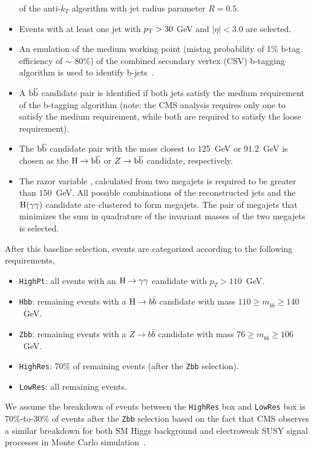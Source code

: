 \begin{itemize}
  of the anti-$k_T$\cite{antikt} algorithm with jet radius parameter $R=0.5$.
\item Events with at least one jet with $p_{\mathrm{T}}>30$ GeV and $|\eta|<3.0$
  are selected.
\item An emulation of the medium working point (mistag probability of
  1\% b-tag efficiency of $\sim$ 80\%) of the combined secondary vertex (CSV) b-tagging
  algorithm is used to identify b-jets~\cite{btag8TeV}.
\item A $\mathrm{b}\overline{\mathrm{b}}$ candidate pair is identified if both jets satisfy the medium requirement of
  the b-tagging algorithm (note: the CMS analysis requires only one to
  satisfy the medium requirement, while both are required to satisfy
  the loose requirement).
\item The $\mathrm{b}\overline{\mathrm{b}}$ candidate pair with the mass closest to 125~GeV or 91.2~GeV is chosen as the $\mathrm{H}\to
  \mathrm{b}\overline{\mathrm{b}}$ or $Z\to \mathrm{b}\overline{\mathrm{b}}$ candidate, respectively.
\item The razor variable \MR, calculated from two megajets is required to be greater than
  $150$~GeV. All possible combinations of the reconstructed jets and
the $\mathrm{H}(\gamma\gamma)$ candidate are clustered to form megajets. The pair of megajets that
minimizes the sum in quadrature of the invariant masses of the two megajets is selected.
\end{itemize}

After this baseline selection, events are categorized according to the
following requirements,
\begin{itemize}
\item \texttt{HighPt}: all events with an $\mathrm{H}\to\gamma\gamma$ candidate
  with $p_{T}>110$~GeV. 
\item \texttt{Hbb}: remaining events with a $\mathrm{H}\to b\bar{b}$ candidate
  with mass $110\geq m_{b\bar{b}}\geq 140$~GeV. 
\item \texttt{Zbb}: remaining events with a $Z\to b\bar{b}$ candidate
  with mass $76\geq m_{b\bar{b}}\geq 106$~GeV. 
\item \texttt{HighRes}: 70\% of remaining events (after the \texttt{Zbb} selection). 
\item \texttt{LowRes}: all remaining events. 
\end{itemize}
We assume the breakdown of events between the \texttt{HighRes} box and \texttt{LowRes}
box is 70\%-to-30\% of events after the \texttt{Zbb} selection based on the fact that CMS 
observes a similar breakdown for both SM Higgs background and
electroweak SUSY signal processes in Monte Carlo simulation~\cite{RazorHgaga}.

